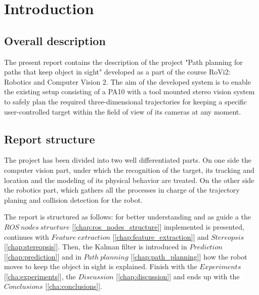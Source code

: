 
\chapter{Introduction}
\label{chap:introduction}

\section{Overall description}
\label{sec:overall_description}
The present report contains the description of the  project "Path planning for paths that keep
object in sight" developed as a part of the course RoVi2: Robotics and Computer Vision 2. 
The aim of the developed system is to enable the existing setup consisting of a PA10 with a tool mounted stereo vision system to safely plan the required three-dimensional trajectories for keeping a specific user-controlled target within the field of view of its cameras at any moment. 

\section{Report structure}
\label{sec:report_structure}
The project has been divided into two well differentiated parts. On one side the computer vision part, under which the recognition of the target, its tracking and location and the modeling of its physical behavior are treated. On the other side the robotics part, which gathers all the processes in charge of the trajectory planing and collision detection for the robot.

The report is structured as follows: for better understanding and as guide a the $ROS\ nodes\ structure$ [\ref{chap:ros_nodes_structure}] implemented is presented, continues with $Feature\ extraction$ [\ref{chap:feature_extraction}] and $Stereopsis$ [\ref{chap:stereopsis}]. Then, the Kalman filter is introduced in $Prediction$ [\ref{chap:prediction}] and in $Path\ planning$ [\ref{chap:path_planning}] how the robot moves to keep the object in sight is explained. Finish with the $Experiments$ [\ref{cha:experiments}], the $Discussion$ [\ref{chap:discussion}] and ends up with the $Conclusions$ [\ref{cha:conclusions}]. 